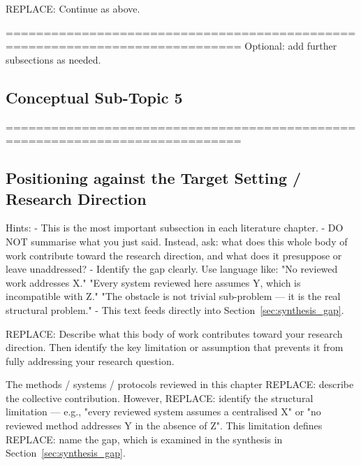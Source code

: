 REPLACE: Continue as above.

 =============================================================================
 Optional: add further subsections as needed.
 \subsection{Conceptual Sub-Topic 5}
 \label{sec:lit_cluster_N:subtopic5}

 =============================================================================
\subsection{Positioning against the Target Setting / Research Direction}
\label{sec:lit_cluster_N:positioning}

 Hints:
 - This is the most important subsection in each literature chapter.
 - DO NOT summarise what you just said. Instead, ask: what does this whole
   body of work contribute toward the research direction, and what does it
   presuppose or leave unaddressed?
 - Identify the gap clearly. Use language like:
     "No reviewed work addresses X."
     "Every system reviewed here assumes Y, which is incompatible with Z."
     "The obstacle is not trivial sub-problem — it is the real structural problem."
 - This text feeds directly into Section~\ref{sec:synthesis_gap}.

REPLACE: Describe what this body of work contributes toward your research
direction. Then identify the key limitation or assumption that prevents it from
fully addressing your research question.

The methods / systems / protocols reviewed in this chapter REPLACE: describe
the collective contribution. However, REPLACE: identify the structural
limitation — e.g., "every reviewed system assumes a centralised X" or "no
reviewed method addresses Y in the absence of Z". This limitation defines
REPLACE: name the gap, which is examined in the synthesis in
Section~\ref{sec:synthesis_gap}.
